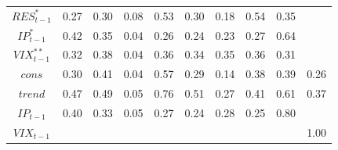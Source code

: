\documentclass[a4paper, twoside]{templates/ociamthesis}
\begin{document}
\begin{table}[!ht]
\begin{tabular}[t]{cccccccccc}
$RES^*_{t-1}$ & 0.27 & 0.30 & 0.08 & 0.53 & 0.30 & 0.18 & 0.54 & 0.35 & \\
$IP^*_{t-1}$ & 0.42 & 0.35 & 0.04 & 0.26 & 0.24 & 0.23 & 0.27 & 0.64 & \\
$VIX^{**}_{t-1}$ & 0.32 & 0.38 & 0.04 & 0.36 & 0.34 & 0.35 & 0.36 & 0.31 & \\
$cons$ & 0.30 & 0.41 & 0.04 & 0.57 & 0.29 & 0.14 & 0.38 & 0.39 & 0.26\\
$trend$ & 0.47 & 0.49 & 0.05 & 0.76 & 0.51 & 0.27 & 0.41 & 0.61 & 0.37\\
$IP_{t-1}$ & 0.40 & 0.33 & 0.05 & 0.27 & 0.24 & 0.28 & 0.25 & 0.80 & \\
$VIX_{t-1}$ &  &  &  &  &  &  &  &  & 1.00\\
\bottomrule
\end{tabular}
\end{table}
\end{document}
